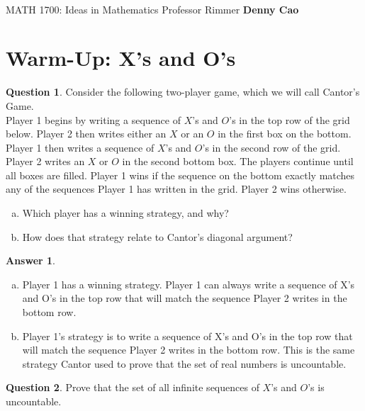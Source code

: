\documentclass[article, 12pt]{article}
\title{\large\bf{\psetName}}
\makeatletter
\theoremstyle{definition}
\newcommand{\courseNumber}{MATH 1700}
\newcommand{\courseName}{Ideas in Mathematics}
\newcommand{\professor}{Professor Rimmer}
\newcommand{\name}{Denny Cao}
\newtheorem{question}{Question}
\newtheorem{answer}{Answer}
\renewcommand{\maketitle}{\bgroup\setlength{\parindent}{0pt}
    \begin{flushleft}
        \textbf{\@title} \\ \vskip0.2cm
        \begingroup
            \fontsize{14pt}{12pt}\selectfont
            \courseNumber: \courseName 
            \vskip0.3cm 
            \professor
        \endgroup \vskip0.3cm
        \@date \hfill\rlap{}\bf{\name} \\ \vskip0.1cm
        \hrulefill
    \end{flushleft}\egroup 
}
\makeatother
\begin{document}
    \maketitle
    \thispagestyle{empty}

    \section{Warm-Up: X's and O's}
    
    \begin{question}
        Consider the following two-player game, which we will call Cantor's Game.
        \\[12pt]
        Player 1 begins by writing a sequence of $X$'s and $O$'s in the top row of the grid below.
        Player 2 then writes either an $X$ or an $O$ in the first box on the bottom. Player 1 then
        writes a sequence of $X$'s and $O$'s in the second row of the grid. Player 2 writes an $X$ or $O$ in the second bottom box. The players continue until all boxes are filled. Player 1 wins if the sequence on the bottom exactly matches any of the sequences Player 1 has written in
        the grid. Player 2 wins otherwise.
        \begin{enumerate}[a)]
            \item Which player has a winning strategy, and why?
            \item How does that strategy relate to Cantor's diagonal argument?
        \end{enumerate}
    \end{question}

    \begin{answer} \ 
        \begin{enumerate}[a)] 
            \item Player 1 has a winning strategy. Player 1 can always write a sequence of X's and O's in the top row that will match the sequence Player 2 writes in the bottom row.
            \item Player 1's strategy is to write a sequence of X's and O's in the top row that will match the sequence Player 2 writes in the bottom row. This is the same strategy Cantor used to prove that the set of real numbers is uncountable.
        \end{enumerate}
    \end{answer}

    \begin{question}
        Prove that the set of all infinite sequences of $X$'s and $O$'s is uncountable.
    \end{question}
    
\end{document}
